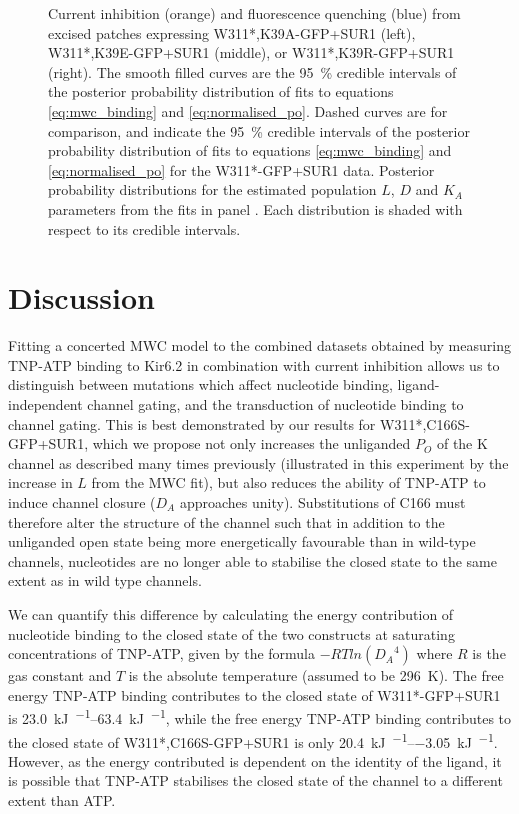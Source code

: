 \begin{figure}[h]
{	 Current inhibition (orange) and fluorescence quenching (blue) from excised patches expressing W311*,K39A-GFP+SUR1 (left), W311*,K39E-GFP+SUR1 (middle), or W311*,K39R-GFP+SUR1 (right).
	The smooth filled curves are the \SI{95}{\percent} credible intervals of the posterior probability distribution of fits to equations \ref{eq:mwc_binding} and \ref{eq:normalised_po}.
	Dashed curves are for comparison, and indicate the \SI{95}{\percent} credible intervals of the posterior probability distribution of fits to equations \ref{eq:mwc_binding} and \ref{eq:normalised_po} for the W311*-GFP+SUR1 data.
	 Posterior probability distributions for the estimated population $L$, $D$ and $K_A$ parameters from the fits in panel .
	Each distribution is shaded with respect to its credible intervals.
	}\label{ch5fig:k39_2}
\end{figure}

\section{Discussion}

Fitting a concerted MWC model to the combined datasets obtained by measuring TNP-ATP binding to Kir6.2 in combination with current inhibition allows us to distinguish between mutations which affect nucleotide binding, ligand-independent channel gating, and the transduction of nucleotide binding to channel gating.
This is best demonstrated by our results for W311*,C166S-GFP+SUR1, which we propose not only increases the unliganded $P_O$ of the K\ATP{} channel as described many times previously (illustrated in this experiment by the increase in $L$ from the MWC fit), but also reduces the ability of TNP-ATP to induce channel closure ($D_A$ approaches unity).
Substitutions of C166 must therefore alter the structure of the channel such that in addition to the unliganded open state being more energetically favourable than in wild-type channels, nucleotides are no longer able to stabilise the closed state to the same extent as in wild type channels.

We can quantify this difference by calculating the energy contribution of nucleotide binding to the closed state of the two constructs at saturating concentrations of TNP-ATP, given by the formula $-RTln({D_A}^4)$ where $R$ is the gas constant and $T$ is the absolute temperature (assumed to be \SI{296}{\kelvin}).
The free energy TNP-ATP binding contributes to the closed state of W311*-GFP+SUR1 is \SIrange{23.0}{63.4}{\kilo\joule\per\Molar}, while the free energy TNP-ATP binding contributes to the closed state of W311*,C166S-GFP+SUR1 is only \SIrange{20.4}{-3.05}{\kilo\joule\per\Molar}.
However, as the energy contributed is dependent on the identity of the ligand, it is possible that TNP-ATP stabilises the closed state of the channel to a different extent than ATP.

